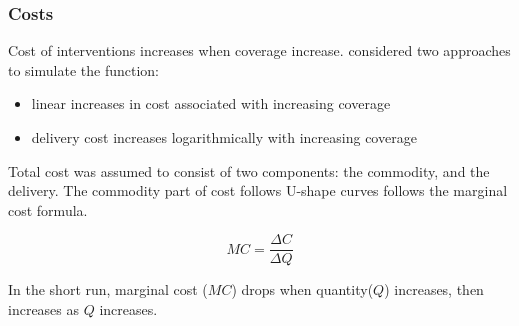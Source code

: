 \documentclass[a4paper, 12pt, twoside]{report}
\begin{document}
\subsubsection{Costs}
Cost of interventions increases when coverage increase.\cite{Winskill2017a} considered two approaches to simulate the function:

\begin{itemize}
	\item linear increases in cost associated with increasing coverage
	\item delivery cost increases logarithmically with increasing coverage
\end{itemize}

Total cost was assumed to consist of two components: the commodity, and the delivery. The commodity part of cost follows U-shape curves follows the marginal cost formula.

\begin{equation}
MC = \frac{\Delta C}{\Delta Q}
\end{equation}

In the short run, marginal cost ($MC$) drops when quantity($Q$) increases, then increases as $Q$ increases.

\end{document}
